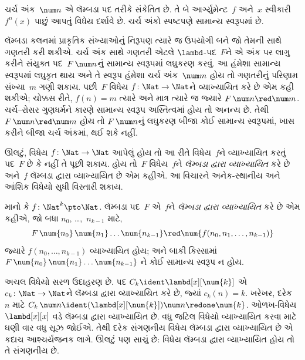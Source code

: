 ચર્ચ અંક~$\num n$ એ લૅમ્બડા પદ તરીકે સંકેતિત
છે. તે બે આર્ગ્યુમેન્ટ~$f$ અને~$x$ સ્વીકારી
$f^n(x)$ પાછું આપતું વિધેય દર્શાવે છે. ચર્ચ
અંકો સ્પષ્ટપણે સામાન્ય સ્વરૂપમાં છે.

લૅમ્બડા કલનમાં પ્રાકૃતિક સંખ્યાઓનું નિરૂપણ ત્યારે જ
ઉપયોગી બને જો તેમની સાથે ગણતરી કરી શકીએ. ચર્ચ અંક
સાથે ગણતરી એટલે $\lambd$-પદ~$F$ને એ અંક પર
લાગુ કરીને સંયુક્ત પદ~$F\, \num n$નું સામાન્ય
સ્વરૂપમાં લઘુકરણ કરવું. આ હંમેશા સામાન્ય સ્વરૂપમાં
લઘુકૃત થાય અને તે સ્વરૂપ હંમેશા ચર્ચ અંક~$\num m$
હોય તો ગણતરીનું પરિણામ સંખ્યા~$m$ ગણી શકાય.
પછી~$F$ વિધેય $f\colon \Nat \to \Nat$ને
વ્યાખ્યાયિત કરે છે એમ કહી શકીએ; ચોક્કસ રીતે,
$f(n) = m$ ત્યારે અને માત્ર ત્યારે જ જ્યારે
$F\, \num n \red \num m$. ચર્ચ--રોસર ગુણધર્મને
કારણે સામાન્ય સ્વરૂપ અસ્તિત્વમાં હોય તો અનન્ય છે.
તેથી $F\, \num n \red \num m$ હોય તો
$F \, \num n$નું લઘુકરણ બીજા કોઈ સામાન્ય
સ્વરૂપમાં, ખાસ કરીને બીજા ચર્ચ અંકમાં, થઈ શકે નહીં.

ઊલટું, વિધેય $f\colon \Nat \to \Nat$ આપેલું હોય
તો આ રીતે વિધેય~$f$ને વ્યાખ્યાયિત કરતું પદ~$F$ છે કે
નહીં તે પૂછી શકાય. હોય તો~$F$ વિધેય~$f$ને
\emph{લૅમ્બડા દ્વારા વ્યાખ્યાયિત} કરે છે અને~$f$
લૅમ્બડા દ્વારા વ્યાખ્યાયિત છે એમ કહીએ. આ વિચારને
અનેક-સ્થાનીય અને આંશિક વિધેયો સુધી વિસ્તારી શકાય.

\begin{defn}
માનો કે $f\colon \Nat^k \pto \Nat$. લૅમ્બડા
પદ~$F$ એ~$f$ને \emph{લૅમ્બડા દ્વારા વ્યાખ્યાયિત}
કરે છે એમ કહીએ, જો બધા
$n_0$, \dots,~$n_{k-1}$ માટે,
\[
F \, \num{n_0} \, \num{n_1} \dots \num{n_{k-1}} \red \num{f(n_0, n_1, \dots,
  n_{k-1})}
\]
જ્યારે $f(n_0, \dots, n_{k-1})$ વ્યાખ્યાયિત
હોય; અને બાકી કિસ્સામાં
$F \, \num{n_0} \, \num{n_1} \dots \num{n_{k-1}}$
ને કોઈ સામાન્ય સ્વરૂપ ન હોય.
\end{defn}

અચલ વિધેયો સરળ ઉદાહરણ છે. પદ
$C_k \ident \lambd[x][\num{k}]$ એ
$c_k\colon \Nat \to \Nat$ને લૅમ્બડા દ્વારા વ્યાખ્યાયિત
કરે છે, જ્યાં $c_k(n) = k$. ખરેખર, દરેક~$n$
માટે $C_k \, \num n \ident
(\lambd[x][\num{k}])\num n \redone \num{k}$.
ઓળખ-વિધેય $\lambd[x][x]$ વડે
લૅમ્બડા દ્વારા વ્યાખ્યાયિત છે. વધુ જટિલ વિધેયો વ્યાખ્યાયિત
કરવા માટે ઘણી વાર વધુ સૂઝ જોઈએ. તેથી દરેક
સંગણનીય વિધેય લૅમ્બડા દ્વારા વ્યાખ્યાયિત છે એ કદાચ
આશ્ચર્યજનક લાગે. ઊલટું પણ સાચું છે: વિધેય
લૅમ્બડા દ્વારા વ્યાખ્યાયિત હોય તો તે સંગણનીય છે.
\endgroup

